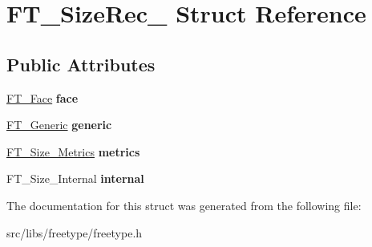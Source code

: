 \hypertarget{struct_f_t___size_rec__}{
\section{FT\_\-SizeRec\_\- Struct Reference}
\label{struct_f_t___size_rec__}
}
\subsection*{Public Attributes}
\begin{DoxyCompactItemize}
\item 
\hypertarget{struct_f_t___size_rec___a21b54fb07feaba8be23321054da98f5f}{
\hyperlink{struct_f_t___face_rec__}{FT\_\-Face} {\bfseries face}}
\label{struct_f_t___size_rec___a21b54fb07feaba8be23321054da98f5f}

\item 
\hypertarget{struct_f_t___size_rec___aa24520b093a9b4ba9ff388bfe7b9491d}{
\hyperlink{struct_f_t___generic__}{FT\_\-Generic} {\bfseries generic}}
\label{struct_f_t___size_rec___aa24520b093a9b4ba9ff388bfe7b9491d}

\item 
\hypertarget{struct_f_t___size_rec___a29a6b518d09f6cf1714d9aed01eddc01}{
\hyperlink{struct_f_t___size___metrics__}{FT\_\-Size\_\-Metrics} {\bfseries metrics}}
\label{struct_f_t___size_rec___a29a6b518d09f6cf1714d9aed01eddc01}

\item 
\hypertarget{struct_f_t___size_rec___a236c47ea3138e485c29b0d7baa5cf3b6}{
FT\_\-Size\_\-Internal {\bfseries internal}}
\label{struct_f_t___size_rec___a236c47ea3138e485c29b0d7baa5cf3b6}

\end{DoxyCompactItemize}


The documentation for this struct was generated from the following file:\begin{DoxyCompactItemize}
\item 
src/libs/freetype/freetype.h\end{DoxyCompactItemize}
